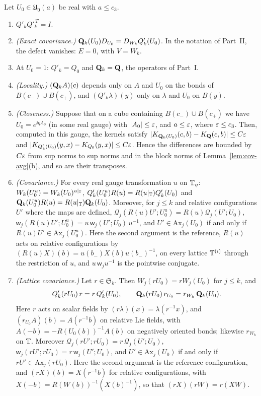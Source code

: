 \begin{proposition}\label{prop:linearized-averages}
Let $U_0\in\mathfrak U_0(a)$ be real with $a\le c_3$.
\begin{enumerate}[label=(\alph*)]
\item $Q'_kQ'^{\,T}_k=I$.
\item \emph{(Exact covariance.)} $\mathbf Q_k(U_0)D_{U_0}=D_{W_k}Q'_k(U_0)$. In the notation of Part~II, the defect vanishes: $E=0$, with $V=W_k$.
\item At $U_0=1$: $Q'_k=Q_0$ and $\mathbf Q_k=\mathbf Q$, the operators of Part~I.
\item \emph{(Locality.)} $(\mathbf Q_kA)(c)$ depends only on $A$ and $U_0$ on the bonds of $B(c_-)\cup B(c_+)$, and $(Q'_k\lambda)(y)$ only on $\lambda$ and $U_0$ on $B(y)$.
\item \emph{(Closeness.)} Suppose that on a cube containing $B(c_-)\cup B(c_+)$ we have $U_0=e^{\ii\eta A_0}$ (in some real gauge) with $|A_0|\le\varepsilon$, and $a\le\varepsilon$, where $\varepsilon\le c_3$. Then, computed in this gauge, the kernels satisfy $|K_{\mathbf Q_k(U_0)}(c,b)-K_{\mathbf Q}(c,b)|\le C\varepsilon$ and $|K_{Q'_k(U_0)}(y,x)-K_{Q_0}(y,x)|\le C\varepsilon$. Hence the differences are bounded by $C\varepsilon$ from sup norms to sup norms and in the block norms of Lemma~\ref{lem:cov-avg}(b), and so are their transposes.
\item \emph{(Covariance.)} For every real gauge transformation $u$ on $\mathbb T_\eta$: $W_k(U_0^u)=W_k(U_0)^{u|_\mathbb T}$, $Q'_k(U_0^u)R(u)=R(u|_\mathbb T)Q'_k(U_0)$ and $\mathbf Q_k(U_0^u)R(u)=R(u|_\mathbb T)\mathbf Q_k(U_0)$. Moreover, for $j\le k$ and relative configurations $U'$ where the maps are defined, $\mathcal Q_j(R(u)U';U_0^u)=R(u)\mathcal Q_j(U';U_0)$, $\mathsf w_j(R(u)U';U_0^u)=u\,\mathsf w_j(U';U_0)\,u^{-1}$, and $U'\in\mathrm{Ax}_j(U_0)$ if and only if $R(u)U'\in\mathrm{Ax}_j(U_0^u)$. Here the second argument is the reference, $R(u)$ acts on relative configurations by $(R(u)X)(b)=u(b_-)X(b)u(b_-)^{-1}$, on every lattice $\mathbb T^{(i)}$ through the restriction of $u$, and $u\,\mathsf w_ju^{-1}$ is the pointwise conjugate.
\item \emph{(Lattice covariance.)} Let $r\in\mathfrak S_k$. Then $W_j(rU_0)=rW_j(U_0)$ for $j\le k$, and
\[
Q'_k(rU_0)\,r=r\,Q'_k(U_0),\qquad\mathbf Q_k(rU_0)\,r_{U_0}=r_{W_k}\,\mathbf Q_k(U_0).
\]
Here $r$ acts on scalar fields by $(r\lambda)(x)=\lambda(r^{-1}x)$, and $(r_{U_0}A)(b)=A(r^{-1}b)$ on relative Lie fields, with $A(-b)=-R(U_0(b))^{-1}A(b)$ on negatively oriented bonds; likewise $r_{W_k}$ on $\mathbb T$. Moreover $\mathcal Q_j(rU';rU_0)=r\,\mathcal Q_j(U';U_0)$, $\mathsf w_j(rU';rU_0)=r\,\mathsf w_j(U';U_0)$, and $U'\in\mathrm{Ax}_j(U_0)$ if and only if $rU'\in\mathrm{Ax}_j(rU_0)$. Here the second argument is the reference configuration, and $(rX)(b)=X(r^{-1}b)$ for relative configurations, with $X(-b)=R(W(b))^{-1}(X(b)^{-1})$, so that $(rX)(rW)=r(XW)$.
\end{enumerate}
\end{proposition}

